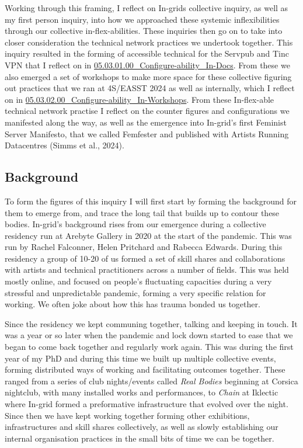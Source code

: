 Working through this framing, I reflect on In-grids collective inquiry,
as well as my first person inquiry, into how we approached these
systemic inflexibilities through our collective in-flex-abilities. These
inquiries then go on to take into closer consideration the technical
network practices we undertook together. This inquiry resulted in the
forming of accessible technical for the Servpub and Tinc VPN that I
reflect on in
\href{05.03.01.00_Configure-ability_In-Docs.md}{05.03.01.00\_Configure-ability\_In-Docs}.
From these we also emerged a set of workshops to make more space for
these collective figuring out practices that we ran at 4S/EASST 2024 as
well as internally, which I reflect on in
\href{05.03.02.00_Configure-ability_In-Workshops.md}{05.03.02.00\_Configure-ability\_In-Workshops}.
From these In-flex-able technical network practise I reflect on the
counter figures and configurations we manifested along the way, as well
as the emergence into In-grid's first Feminist Server Manifesto, that we
called Femfester and published with Artists Running Datacentres (Simms
et al., 2024).

\hypertarget{background}{%
\subsection{Background}\label{background}}

To form the figures of this inquiry I will first start by forming the
background for them to emerge from, and trace the long tail that builds
up to contour these bodies. In-grid's background rises from our
emergence during a collective residency run at Arebyte Gallery in 2020
at the start of the pandemic. This was run by Rachel Falconner, Helen
Pritchard and Rabecca Edwards. During this residency a group of 10-20 of
us formed a set of skill shares and collaborations with artists and
technical practitioners across a number of fields. This was held mostly
online, and focused on people's fluctuating capacities during a very
stressful and unpredictable pandemic, forming a very specific relation
for working. We often joke about how this has trauma bonded us together.

Since the residency we kept communing together, talking and keeping in
touch. It was a year or so later when the pandemic and lock down started
to ease that we began to come back together and regularly work again.
This was during the first year of my PhD and during this time we built
up multiple collective events, forming distributed ways of working and
facilitating outcomes together. These ranged from a series of club
nights/events called \emph{Real Bodies} beginning at Corsica nightclub,
with many installed works and performances, to \emph{Chain} at Iklectic
where In-grid formed a preformative infrastructure that evolved over the
night. Since then we have kept working together forming other
exhibitions, infrastructures and skill shares collectively, as well as
slowly establishing our internal organisation practices in the small
bits of time we can be together.

